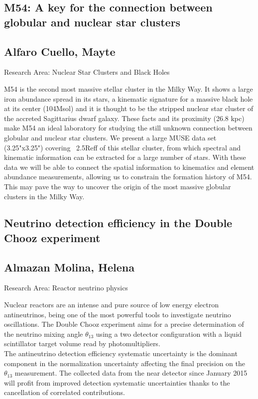 \subsection*{\centering \large M54: A key for the connection between globular and nuclear star clusters}
\subsection*{\centering \normalsize Alfaro Cuello, Mayte}
Research Area: Nuclear Star Clusters and Black Holes\newline

\noindent M54 is the second most massive stellar cluster in the Milky Way. It shows
a large iron abundance spread in its stars, a kinematic signature for a
massive black hole at its center (104Msol) and it is thought to be the
stripped nuclear star cluster of the accreted Sagittarius dwarf galaxy.
These facts and its proximity (26.8 kpc) make M54 an ideal laboratory for
studying the still unknown connection between globular and nuclear star
clusters. We present a large MUSE data set (3.25"x3.25") covering ~2.5Reff
of this stellar cluster, from which spectral and kinematic information can
be extracted for a large number of stars. With these data we will be able
to connect the spatial information to kinematics and element abundance
measurements, allowing us to constrain the formation history of M54. This
may pave the way to uncover the origin of the most massive globular
clusters in the Milky Way.
\subsection*{\centering \large Neutrino detection efficiency in the Double Chooz experiment}
\subsection*{\centering \normalsize Almazan Molina, Helena}
Research Area: Reactor neutrino physics \newline

\noindent Nuclear reactors are an intense and pure source of low energy electron antineutrinos, being one of the most powerful tools to investigate neutrino oscillations. The Double Chooz experiment aims for a precise determination of the neutrino mixing angle $\theta_{13}$ using a two detector configuration with a liquid scintillator target volume read by photomultipliers. \\The antineutrino detection efficiency systematic uncertainty is the dominant component in the normalization uncertainty affecting the final precision on the $\theta_{13}$ measurement. The collected data from the near detector since January 2015 will profit from improved detection systematic uncertainties thanks to the cancellation of correlated contributions.
\newpage
